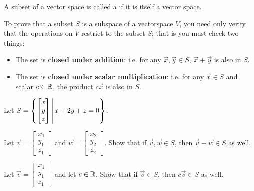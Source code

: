 


\begin{applicationActivities}



\begin{definition}
  A subset of a vector space is called a  if it is
  itself a vector space.
\end{definition}



\begin{remark}
  To prove that a subset \(S\) is a subspace of a vectorspace \(V\), you need only verify that the operations on \(V\) restrict to the subset \(S\); that is you must check two things:

  \begin{itemize}
  \item The set is \textbf{closed under addition}: i.e. for any \(\vec{x},\vec{y} \in S\), \(\vec{x}+\vec{y}\) is also in \(S\).
  \item The set is \textbf{closed under scalar multiplication}: i.e. for any \(\vec{x} \in S\) and scalar \(c \in \mathbb{R}\), the product \(c\vec{x}\) is also in \(S\).
\end{itemize}
\end{remark}

\begin{activity}{15}
Let \(S=\left\{\begin{bmatrix} x \\ y \\ z \end{bmatrix}\,\middle|\, x+2y+z=0\right\}\).  

\begin{subactivity}
Let \(\vec{v}=\begin{bmatrix} x_1 \\ y_1 \\ z_1 \end{bmatrix}\) and \(\vec{w} = \begin{bmatrix} x_2 \\ y_2 \\ z_2 \end{bmatrix} \).  Show that if \(\vec{v}, \vec{w} \in S\), then \(\vec{v}+\vec{w} \in S\) as well.
\end{subactivity}
\begin{subactivity}
Let \(\vec{v}=\begin{bmatrix} x_1 \\ y_1 \\ z_1 \end{bmatrix}\) and let $c \in \mathbb{R}$.  Show that if \(\vec{v} \in S\), then \(c\vec{v} \in S\) as well.
\end{subactivity}


\end{activity}
\end{applicationActivities}
